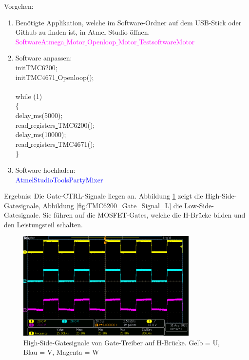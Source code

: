Vorgehen:
\begin{enumerate}
\item Benötigte Applikation, welche im Software-Ordner auf dem USB-Stick oder Github \cite{aebi_projekt-6softwareatmega_2020} zu finden ist, in Atmel Studio öffnen.\\
\textcolor{magenta}{Software\textrightarrow Atmega\underline{ }Motor\underline{ }Openloop\underline{ }Motor\underline{ }Testsoftware\textrightarrow Motor}\\


\item Software anpassen:\\
\textcolor{OliveGreen}{
	initTMC6200;\\
	initTMC4671\underline{ }Openloop();\\
\\
    while (1) \\
    \{\\
		\underline{ }delay\underline{ }ms(5000);\\
		read\underline{ }registers\underline{ }TMC6200();\\
		\underline{ }delay\underline{ }ms(10000);\\
		read\underline{ }registers\underline{ }TMC4671();\\
    \}
}\newline
\item Software hochladen:\\
\textcolor{blue}{AtmelStudio\textrightarrow Tools\textrightarrow PartyMixer}\\
\end{enumerate}

Ergebnis: Die Gate-CTRL-Signale liegen an. Abbildung \ref{fig:TMC6200_Gate_Signal_H} zeigt die High-Side-Gatesignale, Abbildung \ref{fig:TMC6200_Gate_Signal_L} die Low-Side-Gatesignale. Sie führen auf die MOSFET-Gates, welche die H-Brücke bilden und den Leistungsteil schalten.

\begin{figure}[H]
\center
\includegraphics[width = 0.8\textwidth]{graphics/TMC6200_Gate_Signal_H}
\caption{High-Side-Gatesignale von Gate-Treiber auf H-Brücke. Gelb = U, Blau = V, Magenta = W}
\label{fig:TMC6200_Gate_Signal_H}
\end{figure}

